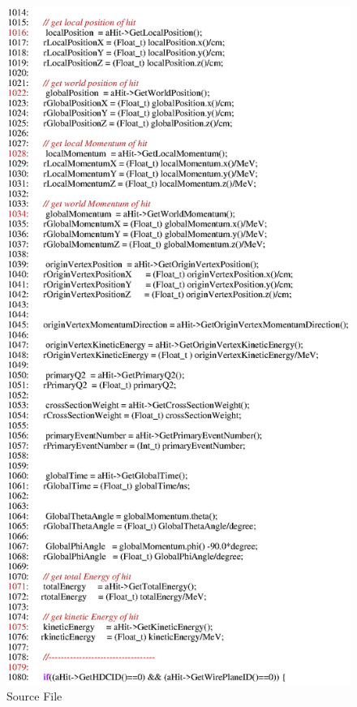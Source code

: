 \begin{figure}[h]
  \hspace{0cm}
  \includegraphics[scale=0.8]{./figures13/QweakSimEventAction.cc-p18.eps}
  \caption{Source File}
           \label{fig:XIII-SC-33}
\end{figure}

